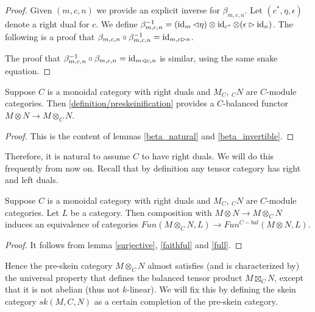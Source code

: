 \begin{proof}
  Given $(m,c,n)$ we provide an explicit inverse for $\beta_{m,c,n}$. Let
  $(c^*,\eta,\epsilon)$ denote a right dual for $c$. We define
  $\beta^{-1}_{m,c,n}=(\operatorname{id}_m\lhd\eta)\otimes\operatorname{id}_{c^*}\otimes
  (\epsilon\rhd\operatorname{id}_n)$. The following is a proof that
  $\beta_{m,c,n}\circ\beta_{m,c,n}^{-1}=\operatorname{id}_{m,c\rhd n}$.
  \begin{center}\end{center}

  \noindent The proof that $\beta_{m,c,n}^{-1}\circ\beta_{m,c,n}=\operatorname{id}_{m\lhd c,n}$ is
  similar, using the same snake equation.
\end{proof}

\begin{proposition}\label{is_balanced}

\noindent Suppose $C$ is a monoidal category with right duals and $M_C$, $_{C}N$ are
$C$-module categories. Then
\ref{definition/preskeinification} provides a $C$-balanced
functor $M\otimes N\to M\otimes_C N$.
\end{proposition}

\begin{proof}
  This is the content of lemmas \ref{beta_natural} and \ref{beta_invertible}.
\end{proof}

\noindent Therefore, it is natural to assume $C$ to have right duals.
We will do this frequently from now on. Recall that by definition any tensor
category has right and left duals.

\begin{proposition}\label{univ_bal}
  Suppose $C$ is a monoidal category with right duals and $M_C$, $_{C}N$ are
  $C$-module categories. Let $L$ be a category. Then composition with
  $M\otimes N \to M\otimes_C N$ induces an equivalence of categories
  $Fun(M\otimes_C N,L)\to Fun^{C-bal}(M\otimes N,L)$.
\end{proposition}

\begin{proof}
  It follows from lemma \ref{surjective}, \ref{faithful} and \ref{full}.
\end{proof}

\begin{remark}
  Hence the pre-skein category $M \otimes_{C} N$ almost satisfies (and is characterized by) the
  universal property that defines the balanced tensor product $M \boxtimes_{C}
  N$, except that it is not abelian (thus not $k$-linear). We will fix this by
  defining the skein category $sk(M,C,N)$ as a certain completion of the
  pre-skein category.
\end{remark}

